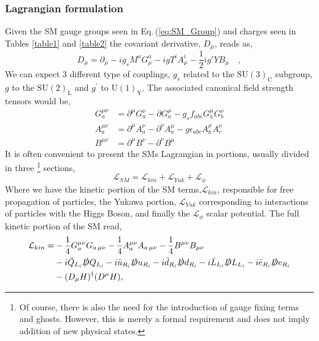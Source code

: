 \subsubsection{Lagrangian formulation }
%
Given the SM gauge groups seen in  Eq.\,(\ref{eq:SM_Group}) and charges seen in Tables \ref{table1} and \ref{table2} the covariant derivative, $D_\mu$, reads as, 
%
\begin{equation}
\label{eq:PartialDefSM}
D_\mu = \partial_\mu - i g_s M^a G^a_\mu - i g T^i A^i_\mu - \frac{1}{2} i g' Y B_\mu \quad ,  
\end{equation}  
%
We can expect 3 different type of couplings, $g_s$ related to the $\mathrm{SU(3)_C}$ subgroup, $g$ to the $\mathrm{SU(2)_L}$ and $g^\prime$ to $\mathrm{U(1)_Y}$. The associated canonical field strength tensors would be,
\begin{align}
G_a^{\mu \nu} & = \partial^\mu G^\nu_a - \partial G^\mu_a - g_s f_{abc} G_a^\mu G_b^\nu  \\ 
A_a^{\mu \nu} & = \partial^\mu A^\nu_a - \partial^\nu A^\mu_a  - g \epsilon_{abc} A^\mu_b A^\nu_c \\
B^{\mu \nu}   & = \partial^\mu B^\nu - \partial^\nu B^\mu 
\end{align}
It is often convenient to present the SMs Lagrangian in portions, usually divided in three \footnote{Of course, there is also the need for the introduction of gauge fixing terms and ghosts. However, this is merely a formal requirement and does not imply addition of new physical states.} sections,
\begin{equation}
\mathcal{L}_{SM} = \mathcal{L}_{kin}  +  \mathcal{L}_{Yuk} +  \mathcal{L}_{\phi} 	
\end{equation}
Where we have the kinetic portion of the SM terms,$\mathcal{L}_{kin}$, responsible for  free propagation of particles, the Yukawa portion, $\mathcal{L}_{Yuk}$  corresponding to interactions of particles with the Higgs Boson, and finally the $\mathcal{L}_{\phi}$ scalar potential. The full kinetic portion of the SM read, 
%
\begin{align}
\label{eq:KinSM}
\mathcal{L}_{kin} = & - \frac{1}{4} G^{\mu \nu}_a G_{a \, \mu \nu}  - \frac{1}{4}  A^{\mu \nu}_a A_{a \,\mu \nu}  
- \frac{1}{4}  B^{\mu \nu} B_{\mu \nu} \nonumber \\ 
 & -i \bar{Q}_{L_i} \slashed{D} Q_{L_i} 
   -i \bar{u}_{R_i} \slashed{D} u_{R_i}  
   -i \bar{d}_{R_i} \slashed{D} d_{R_i}  
   -i \bar{L}_{L_i} \slashed{D} L_{L_i}    
   -i \bar{e}_{R_i} \slashed{D} e_{R_i}   \\
 & - (D_\mu H)^\dagger ( D^\mu H ) ,  \nonumber 
\end{align}
